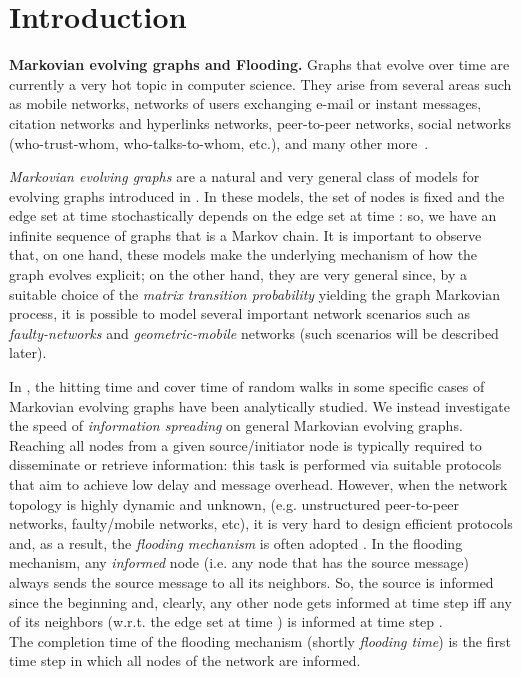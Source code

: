 \documentclass[10pt,a4paper]{article}
\begin{document}
\section{Introduction}
\textbf{Markovian evolving graphs and Flooding.} Graphs that evolve over time are currently a very hot topic in computer science. They arise from several areas such as mobile networks, networks of users exchanging e-mail or instant messages, citation networks and hyperlinks networks, peer-to-peer networks, social networks (who-trust-whom, who-talks-to-whom, etc.), and many other more~\cite{AKL08,BOOK05,CMPS07,OS07,HHL88,P87,Sh01}.


\emph{Markovian evolving graphs} are a natural and very general class of models for evolving graphs introduced in \cite{AKL08}. In these models, the set of nodes is fixed and the edge set at time  stochastically depends on the edge set at time : so, we have an infinite sequence of graphs that is a Markov chain. It is important to observe that, on one hand, these models make the underlying mechanism of how the graph evolves explicit; on the other hand, they are very general since, by a suitable choice of the \emph{matrix transition probability} yielding the graph Markovian process, it is possible to model several important network scenarios such as \emph{faulty-networks} and \emph{geometric-mobile} networks (such scenarios will be described later).

In \cite{AKL08}, the hitting time and cover time of random walks in some specific cases of Markovian evolving graphs have been analytically studied. We instead investigate the speed of \emph{information spreading} on general Markovian evolving graphs. Reaching all nodes from a given source/initiator node is typically required to disseminate or retrieve information: this task is performed via suitable protocols that aim to achieve low delay and message overhead. However, when the network topology is highly dynamic and unknown, (e.g. unstructured peer-to-peer networks, faulty/mobile networks, etc), it is very hard to design efficient protocols   and, as a result, the \emph{flooding mechanism} is often adopted \cite{CL05,GS05,G02,LCS02}. In the flooding mechanism, any \emph{informed} node (i.e. any node that has the source message) always sends the source message to all its neighbors. So, the source is informed since the beginning and, clearly, any other node gets informed at time step  iff any of its neighbors (w.r.t. the edge set at time ) is informed at time step . \\
The completion time of the flooding mechanism (shortly \emph{flooding time}) is the first time step in
which all nodes of the network are informed.
\end{document}
